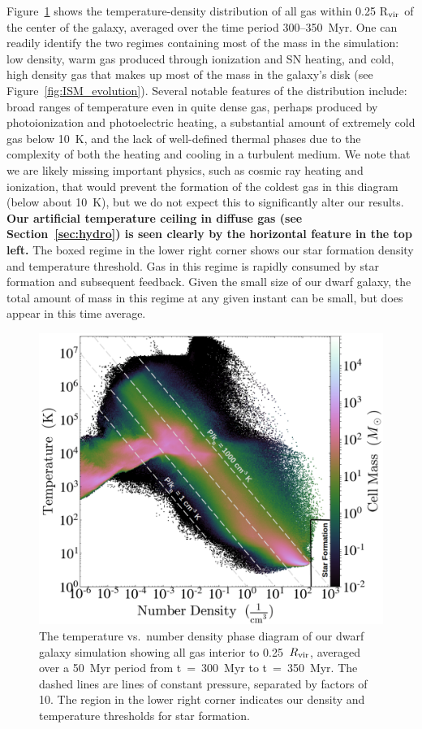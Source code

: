 \documentclass[fleqn,usenatbib,useAMS]{mnras}
\begin{document}
Figure~\ref{fig:phase} shows the temperature-density distribution of all gas within 0.25 R$_{\rm vir}$ of the center of the galaxy, averaged over the time period 300--350~Myr. One can readily identify the two regimes containing most of the mass in the simulation: low density, warm gas produced through ionization and SN heating, and cold, high density gas that makes up most of the mass in the galaxy's disk (see Figure~\ref{fig:ISM_evolution}). Several notable features of the distribution include: broad ranges of temperature even in quite dense gas, perhaps produced by photoionization and photoelectric heating, a substantial amount of extremely cold gas below 10~K, and the lack of well-defined thermal phases due to the complexity of both the heating and cooling in a turbulent medium. We note that we are likely missing important physics, such as cosmic ray heating and ionization, that would prevent the formation of the coldest gas in this diagram (below about 10~K), but we do not expect this to significantly alter our results. \textbf{Our artificial temperature ceiling in diffuse gas (see Section~\ref{sec:hydro}) is seen clearly by the horizontal feature in the top left.}  The boxed regime in the lower right corner shows our star formation density and temperature threshold. Gas in this regime is rapidly consumed by star formation and subsequent feedback. Given the small size of our dwarf galaxy, the total amount of mass in this regime at any given instant can be small, but does appear in this time average. 

\begin{figure}
\includegraphics[width=0.95\linewidth]{phase_diagram.png}
\caption{The temperature vs.\ number density phase diagram of our dwarf galaxy simulation showing all gas interior to 0.25~$R_{\rm vir}$, averaged over a 50~Myr period from t~=~300~Myr to t~=~350~Myr. The dashed lines are lines of constant pressure, separated by factors of 10. The region in the lower right corner indicates our density and temperature thresholds for star formation.}
\label{fig:phase}
\end{figure} 
\end{document}
